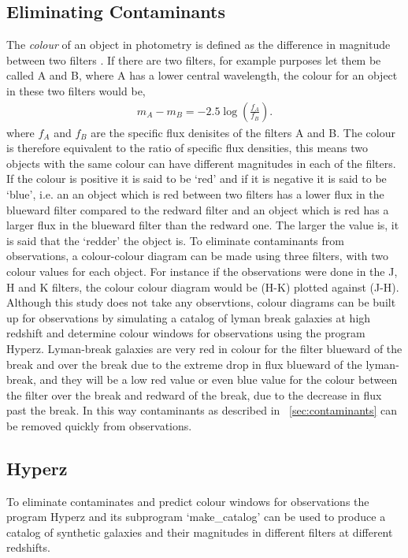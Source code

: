     \subsection{Eliminating Contaminants} %
    \label{sub:Eliminating_Contanimants}
		 The \emph{colour} of an object in photometry is defined as the difference in magnitude between two filters \cite[21]{Romanishin}.  If there are two filters, for example purposes let them be called A and B, where A has a lower central wavelength, the colour for an object in these two filters would be,
		\begin{align}
			m_A-m_B=-2.5\log\left(\frac{f_A}{f_B}\right).
		\end{align}
		 where $f_A$ and $f_B$ are the specific flux denisites of the filters A and B\cite[19]{Romanishin}. The colour is therefore equivalent to the ratio of specific flux densities, this means two objects with the same colour can have different magnitudes in each of the filters. If the colour is positive it is said to be `red' and if it is negative it is said to be `blue', i.e. an an object which is red between two filters has a lower flux in the blueward filter compared to the redward filter and an object which is red has a larger flux in the blueward filter than the redward one.  The larger the value is, it is said that the `redder' the object is. To eliminate contaminants from observations, a colour-colour diagram can be made using three filters, with two colour values for each object. For instance if the observations were done in the J, H and K filters, the colour colour diagram would be (H-K) plotted against (J-H). Although this study does not take any observtions, colour diagrams can be built up for observations by simulating a catalog of lyman break galaxies at high redshift and determine colour windows for observations using the program Hyperz. Lyman-break galaxies are very red in colour for the filter blueward of the break and over the break due to the extreme drop in flux blueward of the lyman-break, and they will be a low red value or even blue value for the colour between the filter over the break and redward of the break, due to the decrease in flux past the break. In this way contaminants as described in ~\ref{sec:contaminants} can be removed quickly from observations.


\subsection{Hyperz} %
	\label{sub:Hyperz}
		To eliminate contaminates and predict colour windows for observations the program Hyperz and its subprogram `make\_catalog' can be used to produce a catalog of synthetic galaxies and their magnitudes in different filters at different redshifts.

